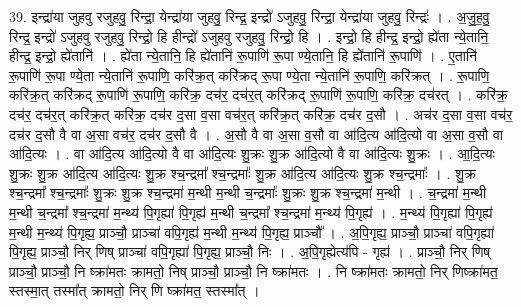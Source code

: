 \documentclass[17pt]{extarticle}
\begin{document}
39. इन्द्रा॑या जुहवु रजुहवु॒ रिन्द्रा॒ येन्द्रा॑या जुहवु॒ रिन्द्र॒ इन्द्रो॑ ऽजुहवु॒ रिन्द्रा॒ येन्द्रा॑या जुहवु॒ रिन्द्रः॑ । . अ॒जु॒ह॒वु॒ रिन्द्र॒ इन्द्रो॑ ऽजुहवु रजुहवु॒ रिन्द्रो॒ हि हीन्द्रो॑ ऽजुहवु रजुहवु॒ रिन्द्रो॒ हि । . इन्द्रो॒ हि हीन्द्र॒ इन्द्रो॒ ह्ये॑ता न्ये॒तानि॒ हीन्द्र॒ इन्द्रो॒ ह्ये॑तानि॑ । . ह्ये॑ता न्ये॒तानि॒ हि ह्ये॑तानि॑ रू॒पाणि॑ रू॒पा ण्ये॒तानि॒ हि ह्ये॑तानि॑ रू॒पाणि॑ । . ए॒तानि॑ रू॒पाणि॑ रू॒पा ण्ये॒ता न्ये॒तानि॑ रू॒पाणि॒ करि॑क्र॒त् करि॑क्रद् रू॒पा ण्ये॒ता न्ये॒तानि॑ रू॒पाणि॒ करि॑क्रत् । . रू॒पाणि॒ करि॑क्र॒त् करि॑क्रद् रू॒पाणि॑ रू॒पाणि॒ करि॑क्र॒ दच॑र॒ दच॑र॒त् करि॑क्रद् रू॒पाणि॑ रू॒पाणि॒ करि॑क्र॒ दच॑रत् । . करि॑क्र॒ दच॑र॒ दच॑र॒त् करि॑क्र॒त् करि॑क्र॒ दच॑र द॒सा व॒सा वच॑र॒त् करि॑क्र॒त् करि॑क्र॒ दच॑र द॒सौ । . अच॑र द॒सा व॒सा वच॑र॒ दच॑र द॒सौ वै वा अ॒सा वच॑र॒ दच॑र द॒सौ वै । . अ॒सौ वै वा अ॒सा व॒सौ वा आ॑दि॒त्य आ॑दि॒त्यो वा अ॒सा व॒सौ वा आ॑दि॒त्यः । . वा आ॑दि॒त्य आ॑दि॒त्यो वै वा आ॑दि॒त्यः शु॒क्रः शु॒क्र आ॑दि॒त्यो वै वा आ॑दि॒त्यः शु॒क्रः । . आ॒दि॒त्यः शु॒क्रः शु॒क्र आ॑दि॒त्य आ॑दि॒त्यः शु॒क्र श्च॒न्द्रमा᳚ श्च॒न्द्रमाः᳚ शु॒क्र आ॑दि॒त्य आ॑दि॒त्यः शु॒क्र श्च॒न्द्रमाः᳚ । . शु॒क्र श्च॒न्द्रमा᳚ श्च॒न्द्रमाः᳚ शु॒क्रः शु॒क्र श्च॒न्द्रमा॑ म॒न्थी म॒न्थी च॒न्द्रमाः᳚ शु॒क्रः शु॒क्र श्च॒न्द्रमा॑ म॒न्थी । . च॒न्द्रमा॑ म॒न्थी म॒न्थी च॒न्द्रमा᳚ श्च॒न्द्रमा॑ म॒न्थ्य॑ पि॒गृह्या॑ पि॒गृह्य॑ म॒न्थी च॒न्द्रमा᳚ श्च॒न्द्रमा॑ म॒न्थ्य॑ पि॒गृह्य॑ । . म॒न्थ्य॑ पि॒गृह्या॑ पि॒गृह्य॑ म॒न्थी म॒न्थ्य॑ पि॒गृह्य॒ प्राञ्चौ॒ प्राञ्चा॑ वपि॒गृह्य॑ म॒न्थी म॒न्थ्य॑ पि॒गृह्य॒ प्राञ्चौ᳚ । . अ॒पि॒गृह्य॒ प्राञ्चौ॒ प्राञ्चा॑ वपि॒गृह्या॑ पि॒गृह्य॒ प्राञ्चौ॒ निर् णिष् प्राञ्चा॑ वपि॒गृह्या॑ पि॒गृह्य॒ प्राञ्चौ॒ निः । . अ॒पि॒गृह्येत्य॑पि - गृह्य॑ । . प्राञ्चौ॒ निर् णिष् प्राञ्चौ॒  प्राञ्चौ॒ नि ष्क्रा॑मतः क्रामतो॒ निष् प्राञ्चौ॒ प्राञ्चौ॒ नि ष्क्रा॑मतः । . नि ष्क्रा॑मतः क्रामतो॒ निर् णिष्क्रा॑मत॒ स्तस्मा॒त् तस्मा᳚त् क्रामतो॒ निर् णि ष्क्रा॑मत॒ स्तस्मा᳚त् । \newline
\pagebreak
{}
\end{document}
